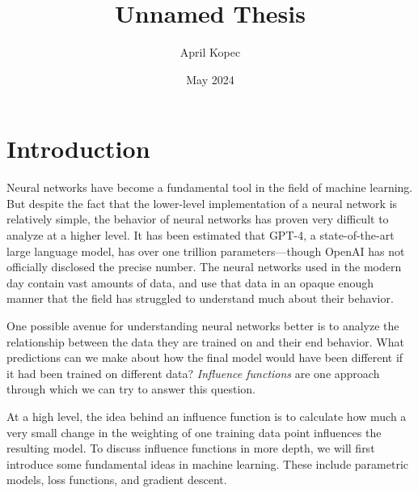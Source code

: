\documentclass[12pt,twoside]{reedthesis}
\title{Unnamed Thesis}
\author{April Kopec}
\date{May 2024}
\begin{document}
\maketitle

\theoremstyle{definition}
\newtheorem{definition}{Definition}[chapter]



\mainmatter %
\pagestyle{fancyplain} %


\onehalfspacing

    \chapter*{Introduction}
Neural networks have become a fundamental tool in the field of machine learning. But despite the fact that the lower-level implementation of a neural network is relatively simple, the behavior of neural networks has proven very difficult to analyze at a higher level. It has been estimated that GPT-4, a state-of-the-art large language model, has over one trillion parameters—though OpenAI has not officially disclosed the precise number. The neural networks used in the modern day contain vast amounts of data, and use that data in an opaque enough manner that the field has struggled to understand much about their behavior.

One possible avenue for understanding neural networks better is to analyze the relationship between the data they are trained on and their end behavior. What predictions can we make about how the final model would have been different if it had been trained on different data? \textit{Influence functions} are one approach through which we can try to answer this question.

At a high level, the idea behind an influence function is to calculate how much a very small change in the weighting of one training data point influences the resulting model. To discuss influence functions in more depth, we will first introduce some fundamental ideas in machine learning. These include parametric models, loss functions, and gradient descent.
\end{document}
